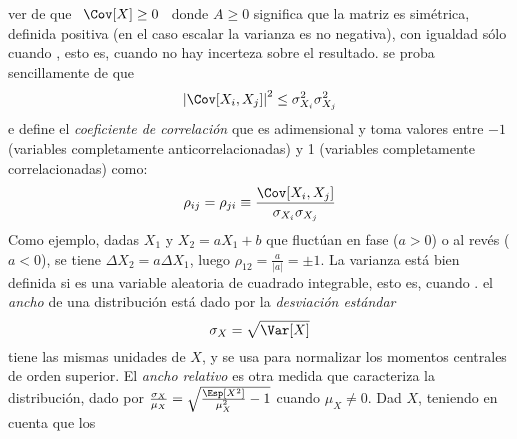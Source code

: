\begin{itemize}
\begin{enumerate}
{  ver de  que \ $\Cov[X]  \ge 0$ \  donde $A \ge 0$  significa que la  matriz es
  sim\'etrica,  definida  positiva  (en  el  caso  escalar  la  varianza  es  no
  negativa),  con igualdad} s\'olo  cuando , esto  es, cuando no hay incerteza  sobre el resultado.    se  proba  sencillamente  de
que  $$\left|   \Cov[X_i,X_j]  \right|^2  \le   \sigma_{X_i}^2  \sigma_{X_j}^2$$
e   define     el  {\it   coeficiente  de
  correlaci\'on}  que  es adimensional  y  toma  valores  entre $-1$  (variables
completamente anticorrelacionadas) y 1 (variables completamente correlacionadas)
como:
  \[
  \rho_{ij} = \rho_{ji} \equiv \frac{\Cov[X_i,X_j]}{\sigma_{X_i} \sigma_{X_j}}
  \]
  Como ejemplo, dadas $X_1$ y $X_2 = a X_1 + b$ que fluct\'uan en fase ($a>0$) o
  al rev\'es ($a<0$),  se tiene $\Delta X_2 = a \Delta  X_1$, luego $\rho_{12} =
  \frac{a}{|a|}   =  \pm   1$.\newline   {}   La
  varianza  est\'a bien  definida si   es  una variable
  aleatoria  de  cuadrado  integrable,  esto  es,  cuando  .     el {\it
    ancho}  de   una  distribuci\'on  est\'a  dado  por   la  {\it  desviaci\'on
    est\'andar}
  \[
  \sigma_X = \sqrt{\Var[X]}
  \]
  tiene  las mismas  unidades de  $X$,  y se  usa para  normalizar los  momentos
  centrales  de orden  superior.  El  {\it ancho  relativo} es  otra  medida que
  caracteriza   la   distribuci\'on,    dado   por   $\frac{\sigma_X}{\mu_X}   =
  \sqrt{\frac{\Esp\left[    X^2   \right]}{\mu_X^2}-1}$   cuando    $\mu_X   \ne
  0$. \newline Dad $X$, teniendo en cuenta que los

\end{enumerate}
\end{itemize}
